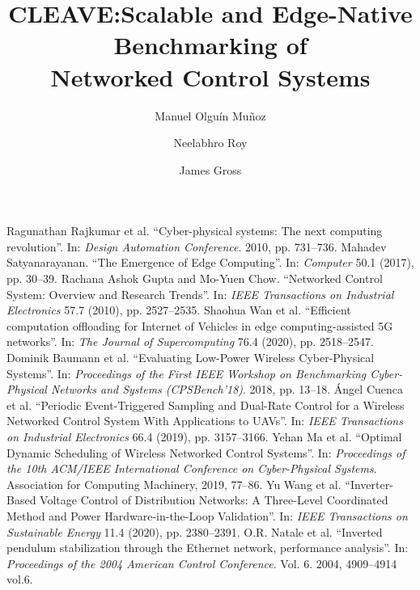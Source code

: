 \documentclass[sigconf,9pt,natbib=false,nonacm=true]{acmart}
\title[CLEAVE]{CLEAVE:\@ Scalable and Edge-Native Benchmarking of\\{Networked Control Systems}}
\author{Manuel {Olguín Muñoz}}
\affiliation{%
\institution{KTH Royal Institute of Technology}%
\city{Stockholm}%
\country{Sweden}%
}
\author{Neelabhro Roy}
\affiliation{%
\institution{KTH Royal Institute of Technology}%
\city{Stockholm}%
\country{Sweden}%
}
\author{James Gross}
\affiliation{%
\institution{KTH Royal Institute of Technology}%
\city{Stockholm}%
\country{Sweden}%
}
\begin{document}
\maketitle
\renewcommand{\shortauthors}{{Olguín Muñoz} et al.}







\begin{thebibliography}{99}
  Ragunathan Rajkumar et al. “Cyber-physical systems: The next computing revolution”. In: \emph{Design Automation Conference}. 2010, pp. 731–736.
  Mahadev Satyanarayanan. “The Emergence of Edge Computing”. In: \emph{Computer} 50.1 (2017), pp. 30–39.
  Rachana Ashok Gupta and Mo-Yuen Chow. “Networked Control System: Overview and Research Trends”. In: \emph{IEEE Transactions on Industrial Electronics} 57.7 (2010), pp. 2527–2535. %
  Shaohua Wan et al. “Efficient computation offloading for {Internet of Vehicles} in edge computing-assisted 5G networks”. In: \emph{The Journal of Supercomputing} 76.4 (2020), pp. 2518–2547. %
  Dominik Baumann et al. “Evaluating Low-Power Wireless Cyber-Physical Systems”. In: \emph{Proceedings of the First IEEE Workshop on Benchmarking Cyber-Physical Networks and Systems (CPSBench’18)}. 2018, pp. 13–18.
  Ángel Cuenca et al. “Periodic Event-Triggered Sampling and Dual-Rate Control for a Wireless Networked Control System With Applications to {UAVs}”. In: \emph{IEEE Transactions on Industrial Electronics} 66.4 (2019), pp. 3157–3166.
  Yehan Ma et al. “Optimal Dynamic Scheduling of Wireless Networked Control Systems”. In: \emph{Proceedings of the 10th ACM/IEEE International Conference on Cyber-Physical Systems}. Association for Computing Machinery, 2019, 77–86.
  Yu Wang et al. “Inverter-Based Voltage Control of Distribution Networks: A Three-Level Coordinated Method and Power Hardware-in-the-Loop Validation”. In: \emph{IEEE Transactions on Sustainable Energy} 11.4 (2020), pp. 2380–2391.
  O.R. Natale et al. “Inverted pendulum stabilization through the {Ethernet} network, performance analysis”. In: \emph{Proceedings of the 2004 American Control Conference}. Vol. 6. 2004, 4909–4914 vol.6.

\end{thebibliography}
\end{document}

